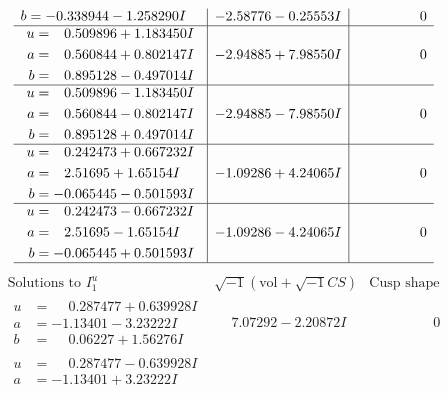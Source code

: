 \documentclass[1p]{elsarticle_modified}
\theoremstyle{definition}
\newcommand{\I}{\sqrt{-1}}
\begin{document}
$$\begin{array}{c|c|c}
\begin{aligned}
b &= -0.338944 - 1.258290 I\end{aligned}
 & -2.58776 - 0.25553 I & \phantom{-0.000000 } 0 \\ \hline\begin{aligned}
u &= \phantom{-}0.509896 + 1.183450 I \\
a &= \phantom{-}0.560844 + 0.802147 I \\
b &= \phantom{-}0.895128 - 0.497014 I\end{aligned}
 & -2.94885 + 7.98550 I & \phantom{-0.000000 } 0 \\ \hline\begin{aligned}
u &= \phantom{-}0.509896 - 1.183450 I \\
a &= \phantom{-}0.560844 - 0.802147 I \\
b &= \phantom{-}0.895128 + 0.497014 I\end{aligned}
 & -2.94885 - 7.98550 I & \phantom{-0.000000 } 0 \\ \hline\begin{aligned}
u &= \phantom{-}0.242473 + 0.667232 I \\
a &= \phantom{-}2.51695 + 1.65154 I \\
b &= -0.065445 - 0.501593 I\end{aligned}
 & -1.09286 + 4.24065 I & \phantom{-0.000000 } 0 \\ \hline\begin{aligned}
u &= \phantom{-}0.242473 - 0.667232 I \\
a &= \phantom{-}2.51695 - 1.65154 I \\
b &= -0.065445 + 0.501593 I\end{aligned}
 & -1.09286 - 4.24065 I & \phantom{-0.000000 } 0\\
 \hline 
 \end{array}$$\newpage$$\begin{array}{c|c|c}  
\text{Solutions to }I^u_{1}& \I (\text{vol} + \sqrt{-1}CS) & \text{Cusp shape}\\
 \hline 
\begin{aligned}
u &= \phantom{-}0.287477 + 0.639928 I \\
a &= -1.13401 - 3.23222 I \\
b &= \phantom{-}0.06227 + 1.56276 I\end{aligned}
 & \phantom{-}7.07292 - 2.20872 I & \phantom{-0.000000 } 0 \\ \hline\begin{aligned}
u &= \phantom{-}0.287477 - 0.639928 I \\
a &= -1.13401 + 3.23222 I \\

\end{aligned}
\end{array}$$
\end{document}
